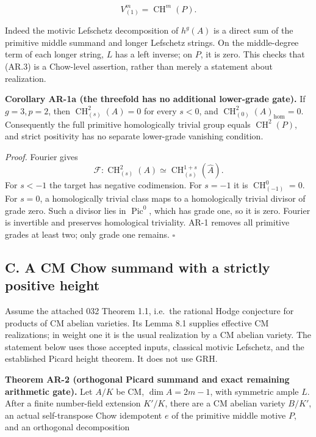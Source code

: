 \documentclass[11pt,a4paper]{article}
\begin{document}
\[
V^m_{(1)}=\operatorname{CH}^m(P).
\tag{AR.3}
\]

Indeed the motivic Lefschetz decomposition of \(h^g(A)\) is a direct sum
of the primitive middle summand and longer Lefschetz strings. On the
middle-degree term of each longer string, \(L\) has a left inverse; on
\(P\), it is zero. This checks that (AR.3) is a Chow-level assertion,
rather than merely a statement about realization.

\textbf{Corollary AR-1a (the threefold has no additional lower-grade
gate).} If \(g=3,p=2\), then \(\operatorname{CH}^2_{(s)}(A)=0\) for
every \(s<0\), and \(\operatorname{CH}^2_{(0)}(A)_{\mathrm{hom}}=0\).
Consequently the full primitive homologically trivial group equals
\(\operatorname{CH}^2(P)\), and strict positivity has no separate
lower-grade vanishing condition.

\emph{Proof.} Fourier gives \[
\mathcal F:\operatorname{CH}^2_{(s)}(A)
 \simeq\operatorname{CH}^{1+s}_{(s)}(\widehat A).
\] For \(s<-1\) the target has negative codimension. For \(s=-1\) it is
\(\operatorname{CH}^0_{(-1)}=0\). For \(s=0\), a homologically trivial
class maps to a homologically trivial divisor of grade zero. Such a
divisor lies in \(\operatorname{Pic}^0\), which has grade one, so it is
zero. Fourier is invertible and preserves homological triviality. AR-1
removes all primitive grades at least two; only grade one remains.
\(\square\)

\subsection{C. A CM Chow summand with a strictly positive
height}\label{c.-a-cm-chow-summand-with-a-strictly-positive-height}

Assume the attached 032 Theorem 1.1, i.e.~the rational Hodge conjecture
for products of CM abelian varieties. Its Lemma 8.1 supplies effective
CM realizations; in weight one it is the usual realization by a CM
abelian variety. The statement below uses those accepted inputs,
classical motivic Lefschetz, and the established Picard height theorem.
It does not use GRH.

\textbf{Theorem AR-2 (orthogonal Picard summand and exact remaining
arithmetic gate).} Let \(A/K\) be CM, \(\dim A=2m-1\), with symmetric
ample \(L\). After a finite number-field extension \(K'/K\), there are a
CM abelian variety \(B/K'\), an actual self-transpose Chow idempotent
\(e\) of the primitive middle motive \(P\), and an orthogonal
decomposition
\end{document}
